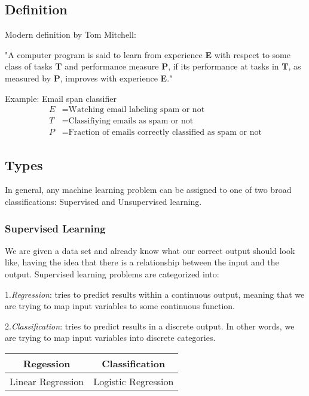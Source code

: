 \subsection{Definition}

Modern definition by Tom Mitchell: 
\begin{displayquote}
    "A computer program is said to learn from experience \textbf{E} with respect to some class of tasks \textbf{T} and performance measure \textbf{P}, if its performance at tasks in \textbf{T}, as measured by \textbf{P}, improves with experience \textbf{E}."
\end{displayquote}

Example: Email span classifier
\begin{align*}
    E &= \text{Watching email labeling spam or not} \\
    T &= \text{Classifiying emails as spam or not} \\
    P &= \text{Fraction of emails correctly classified as spam or not} 
\end{align*}
    

\subsection{Types}
In general, any machine learning problem can be assigned to one of two broad classifications: Supervised and Unsupervised learning.

\subsubsection{Supervised Learning}
We are given a data set and already know what our correct output should look like, having the idea that there is a relationship between the input and the output.
Supervised learning problems are categorized into:

1.\textit{Regression}: tries to predict results within a continuous output, meaning that we are trying to map input variables to some continuous function.

2.\textit{Classification}: tries to predict results in a discrete output. In other words, we are trying to map input variables into discrete categories.

\begin{center}
\begin{tabular}{ |c|c| } 
\hline
\textbf{Regession} & \textbf{Classification} \\
\hline
Linear Regression & Logistic Regression \\
\hline
\end{tabular}
\end{center}


